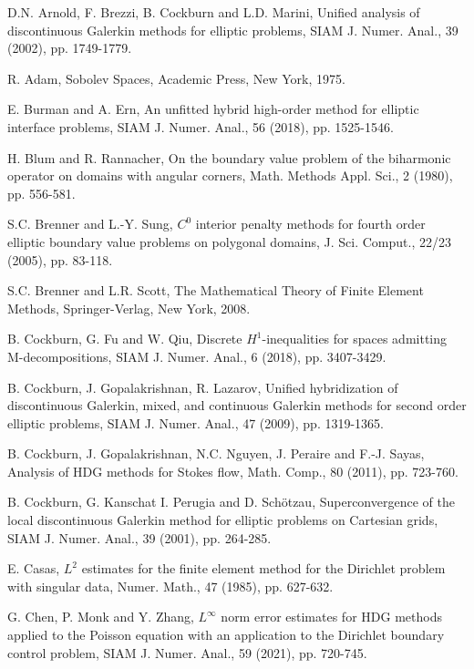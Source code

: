 \documentclass[1996/10/24]{amsart}
\theoremstyle{definition}
\numberwithin{equation}{section}
\begin{document}
\begin{thebibliography}{}
D.N. Arnold, F. Brezzi, B. Cockburn and L.D. Marini, Unified analysis of discontinuous Galerkin methods for elliptic problems, SIAM J. Numer. Anal.,
39 (2002), pp. 1749-1779.

R. Adam, Sobolev Spaces, Academic Press, New York, 1975.

E. Burman and A. Ern, An unfitted hybrid high-order method for elliptic interface problems, SIAM J. Numer. Anal., 56 (2018), pp. 1525-1546.

H. Blum and R. Rannacher, On the boundary value problem of the biharmonic operator on domains with angular corners, Math. Methods Appl. Sci., 2 (1980),
pp. 556-581.

S.C. Brenner and L.-Y. Sung, $C^0$ interior penalty methods for fourth order elliptic boundary value problems on polygonal domains,
J. Sci. Comput., 22/23 (2005), pp. 83-118.

S.C. Brenner and L.R. Scott, The Mathematical Theory of Finite Element Methods, Springer-Verlag, New York, 2008.

B. Cockburn, G. Fu and W. Qiu, Discrete $H^1$-inequalities for spaces admitting M-decompositions, SIAM J. Numer. Anal., 6 (2018), pp. 3407-3429.

B. Cockburn, J. Gopalakrishnan, R. Lazarov, Unified hybridization of discontinuous Galerkin, mixed, and continuous Galerkin methods for second order elliptic
problems, SIAM J. Numer. Anal., 47 (2009), pp. 1319-1365.

B. Cockburn, J. Gopalakrishnan, N.C. Nguyen, J. Peraire and F.-J. Sayas, Analysis of HDG methods for Stokes flow, Math. Comp., 80 (2011), pp. 723-760.

B. Cockburn, G. Kanschat I. Perugia and D. Sch\"{o}tzau, Superconvergence of the local discontinuous Galerkin method for elliptic problems on Cartesian grids,
SIAM J. Numer. Anal., 39 (2001), pp. 264-285.

E. Casas, $L^2$ estimates for the finite element method for the Dirichlet problem with singular data, Numer. Math., 47 (1985), pp. 627-632.

G. Chen, P. Monk and Y. Zhang, $L^{\infty}$ norm error estimates for HDG methods applied to the Poisson equation with an application to the Dirichlet
boundary control problem, SIAM J. Numer. Anal., 59 (2021), pp. 720-745.


\end{thebibliography}
\end{document}
